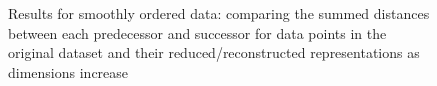 \documentclass[pdftex,12pt,a4paper]{report}
\begin{document}
\begin{figure}[htb!]
    \caption{Results for smoothly ordered data: comparing the summed distances between each predecessor and successor for data points in the original dataset and their reduced/reconstructed representations as dimensions increase}\label{fig:cpca-avg_dev_vs_high_dim-oneline}
\end{figure}
\end{document}
